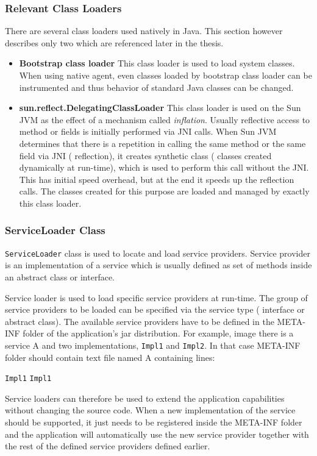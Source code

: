 \subsubsection{Relevant Class Loaders}
There are several class loaders used natively in Java. This section however describes only two which are referenced later in the thesis. 

\begin{itemize}
	\item\textbf{Bootstrap class loader} \newline
	This class loader is used to load system classes. When using native agent, even classes loaded by bootstrap class loader can be instrumented and thus behavior of standard Java classes can be changed.
	
	\item  \textbf{sun.reflect.DelegatingClassLoader} \newline
	This class loader is used on the Sun JVM as the effect of a mechanism called \textit{inflation}. Usually reflective access to method or fields is initially performed via JNI calls. When Sun JVM determines that there is a repetition in calling the same method or the same field via JNI ( reflection), it creates synthetic class ( classes created dynamically at run-time), which is used to perform this call without the JNI. This has initial speed overhead, but at the end it speeds up the reflection calls. The classes created for this purpose are loaded and managed by exactly this class loader. 
\end{itemize}
\subsubsection{ServiceLoader Class}
\texttt{ServiceLoader} class is used to locate and load service providers. Service provider is an implementation of a service which is usually defined as set of methods inside an abstract class or interface. 

Service loader is used to load specific service providers at run-time. The group of service providers to be loaded can be specified via the service type ( interface or abstract class). The available service providers have to be defined in the META-INF folder of the application's jar distribution. For example, image there is a service A and two implementations, \texttt{Impl1} and \texttt{Impl2}. In that case META-INF folder should contain text file named A containing lines:
\begin{center}
\texttt{Impl1} \newline
\texttt{Impl1}  \newline
\end{center}
Service loaders can therefore be used to extend the application capabilities without changing the source code. When a new implementation of the service should be supported, it just needs to be registered inside the META-INF folder and the application will automatically use the new service provider together with the rest of the defined service providers defined earlier.
